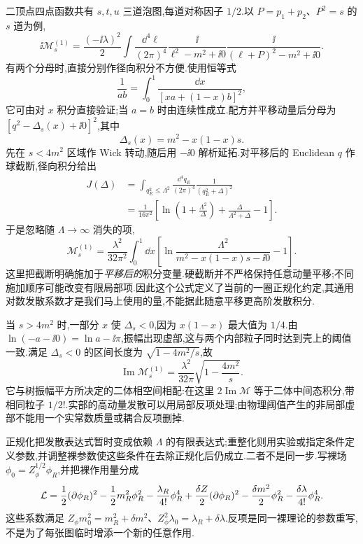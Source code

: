 二顶点四点函数共有 $s,t,u$ 三道泡图,每道对称因子 $1/2$.以 $P=p_1+p_2$、$P^2=s$ 的 $s$ 道为例,
\begin{equation}
 \ii\mathcal M_s^{(1)}
 =\frac{(-\ii\lambda)^2}{2}\int\frac{\dd^4\ell}{(2\pi)^4}
 \frac{\ii}{\ell^2-m^2+\ii0}
 \frac{\ii}{(\ell+P)^2-m^2+\ii0}.
 \label{eq:bubble-minkowski}
\end{equation}
有两个分母时,直接分别作径向积分不方便.使用恒等式
\begin{equation}
 \frac1{ab}=\int_0^1\frac{\dd x}{[xa+(1-x)b]^2},
\end{equation}
它可由对 $x$ 积分直接验证;当 $a=b$ 时由连续性成立.配方并平移动量后分母为 $[q^2-\Delta_s(x)+\ii0]^2$,其中
\begin{equation}
 \Delta_s(x)=m^2-x(1-x)s.
\end{equation}
先在 $s<4m^2$ 区域作 Wick 转动,随后用 $-\ii0$ 解析延拓.对平移后的 Euclidean $q$ 作球截断,径向积分给出
\begin{align}
 J(\Delta)&=\int_{q_E^2\leq\Lambda^2}\frac{\dd^4q_E}{(2\pi)^4}
 \frac1{(q_E^2+\Delta)^2}\\
 &=\frac1{16\pi^2}\left[
 \ln\left(1+\frac{\Lambda^2}{\Delta}\right)
 +\frac{\Delta}{\Lambda^2+\Delta}-1\right].
\end{align}
于是忽略随 $\Lambda\to\infty$ 消失的项,
\begin{equation}
 \mathcal M_s^{(1)}
 =\frac{\lambda^2}{32\pi^2}\int_0^1\dd x
 \left[\ln\frac{\Lambda^2}{m^2-x(1-x)s-\ii0}-1\right].
 \label{eq:bubble-cutoff}
\end{equation}
这里把截断明确施加于\emph{平移后的}积分变量.硬截断并不严格保持任意动量平移;不同施加顺序可能改变有限局部项.因此这个公式定义了当前的一圈正规化约定,其通用对数发散系数才是我们马上使用的量,不能据此随意平移更高阶发散积分.

当 $s>4m^2$ 时,一部分 $x$ 使 $\Delta_s<0$,因为 $x(1-x)$ 最大值为 $1/4$.由 $\ln(-a-\ii0)=\ln a-\ii\pi$,振幅出现虚部,这与两个内部粒子同时达到壳上的阈值一致.满足 $\Delta_s<0$ 的区间长度为 $\sqrt{1-4m^2/s}$,故
\begin{equation}
 \operatorname{Im}\mathcal M_s^{(1)}
 =\frac{\lambda^2}{32\pi}\sqrt{1-\frac{4m^2}{s}}.
\end{equation}
它与树振幅平方所决定的二体相空间相配:在这里 $2\operatorname{Im}\mathcal M$ 等于二体中间态积分,带相同粒子 $1/2!$.实部的高动量发散可以用局部反项处理;由物理阈值产生的非局部虚部不能用一个实常数质量或耦合反项删掉.


正规化把发散表达式暂时变成依赖 $\Lambda$ 的有限表达式;重整化则用实验或指定条件定义参数,并调整裸参数使这些条件在去除正规化后仍成立.二者不是同一步.写裸场 $\phi_0=Z_\phi^{1/2}\phi_R$,并把裸作用量分成
\begin{equation}
 \mathcal L=\frac12(\partial\phi_R)^2-\frac12m_R^2\phi_R^2
 -\frac{\lambda_R}{4!}\phi_R^4
 +\frac{\delta Z}{2}(\partial\phi_R)^2
 -\frac{\delta m^2}{2}\phi_R^2-\frac{\delta\lambda}{4!}\phi_R^4.
 \label{eq:scalar-counterterms}
\end{equation}
这些系数满足 $Z_\phi m_0^2=m_R^2+\delta m^2$、$Z_\phi^2\lambda_0=\lambda_R+\delta\lambda$.反项是同一裸理论的参数重写,不是为了每张图临时增添一个新的任意作用.

